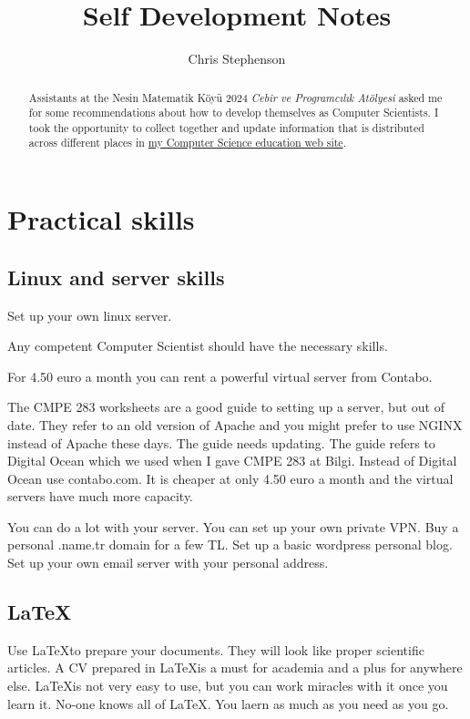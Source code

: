 \documentclass[a4paper,10pt]{article}
\title{Self Development Notes}
\author{Chris Stephenson}
\begin{document}
\maketitle
\begin{abstract}
Assistants at the Nesin Matematik Köyü 2024 \textit{Cebir ve Programcılık Atölyesi} asked me for some recommendations about how to develop themselves as Computer Scientists. I took the opportunity to collect together  and update information that is distributed across different places in \href{https://chrisstephenson.org}{my Computer Science education web site}.
 
\end{abstract}
\newpage
\section{Practical skills}

\subsection{Linux and server skills}
Set up your own linux server.

Any competent Computer Scientist should have the necessary skills.

For 4.50 euro a month you can rent a powerful virtual server from Contabo.

The CMPE 283 worksheets are a good guide to setting up a server, but out of date. They refer to an old version of Apache and you might prefer to use NGINX instead of Apache these days. The guide needs updating.  The guide refers to Digital Ocean which we used when I gave CMPE 283 at Bilgi. Instead of Digital Ocean use  contabo.com. It is cheaper at only 4.50 euro a month and the virtual servers have much more capacity.

You can do a lot with your server. You can set up your own private VPN. Buy a personal .name.tr domain for a few TL. Set up a basic wordpress personal blog. Set up your own email server with your personal address.

\subsection{\LaTeX}

Use \LaTeX to prepare your documents. They will look like proper scientific articles. A CV prepared in \LaTeX is a must for academia and a plus for anywhere else. \LaTeX is not very easy to use, but you can work miracles with it once you learn it. No-one knows all of \LaTeX. You laern as much as you need as you go. 
\end{document}
